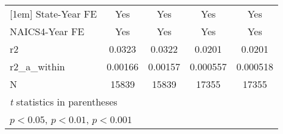 {\begin{tabular}{l*{4}{c}}
[1em]
State-Year FE&         Yes         &         Yes         &         Yes         &         Yes         \\
[1em]
NAICS4-Year FE&         Yes         &         Yes         &         Yes         &         Yes         \\
\hline
r2          &      0.0323         &      0.0322         &      0.0201         &      0.0201         \\
r2\_a\_within &     0.00166         &     0.00157         &    0.000557         &    0.000518         \\
N           &       15839         &       15839         &       17355         &       17355         \\
\hline\hline
\multicolumn{5}{l}{\footnotesize \textit{t} statistics in parentheses}\\
\multicolumn{5}{l}{\footnotesize \sym{*} \(p<0.05\), \sym{**} \(p<0.01\), \sym{***} \(p<0.001\)}\\
\end{tabular}
}
